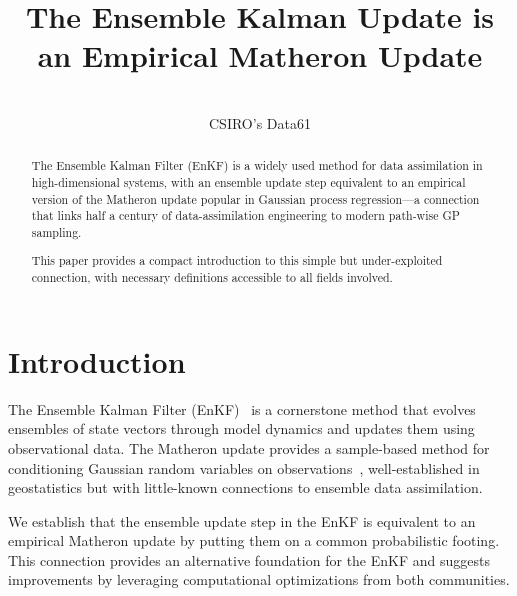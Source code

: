 \documentclass[wcp]{jmlr} %
\title[Ensemble Kalman Update]{The Ensemble Kalman Update is an Empirical Matheron Update}
\author{\Name{Dan MacKinlay\,\orcidlink{0000-0001-6077-2684}}\\
  \addr CSIRO's Data61}
\begin{document}



\maketitle

\begin{abstract}
The Ensemble Kalman Filter (EnKF) is a widely used method for data assimilation in high-dimensional systems, with an ensemble update step equivalent to an empirical version of the Matheron update popular in Gaussian process regression—a connection that links half a century of data-assimilation engineering to modern path-wise GP sampling.

This paper provides a compact introduction to this simple but under-exploited connection, with necessary definitions accessible to all fields involved.

\end{abstract}

\section{Introduction}

The Ensemble Kalman Filter (EnKF)~\cite{Evensen2003Ensemble,Evensen2009Data} is a cornerstone method that evolves ensembles of state vectors through model dynamics and updates them using observational data. The Matheron update provides a sample-based method for conditioning Gaussian random variables on observations~\cite{Doucet2010Note,Wilson2020Efficiently,Wilson2021Pathwise}, well-established in geostatistics but with little-known connections to ensemble data assimilation.

We establish that the ensemble update step in the EnKF is equivalent to an empirical Matheron update by putting them on a common probabilistic footing. This connection provides an alternative foundation for the EnKF and suggests improvements by leveraging computational optimizations from both communities.
\end{document}
